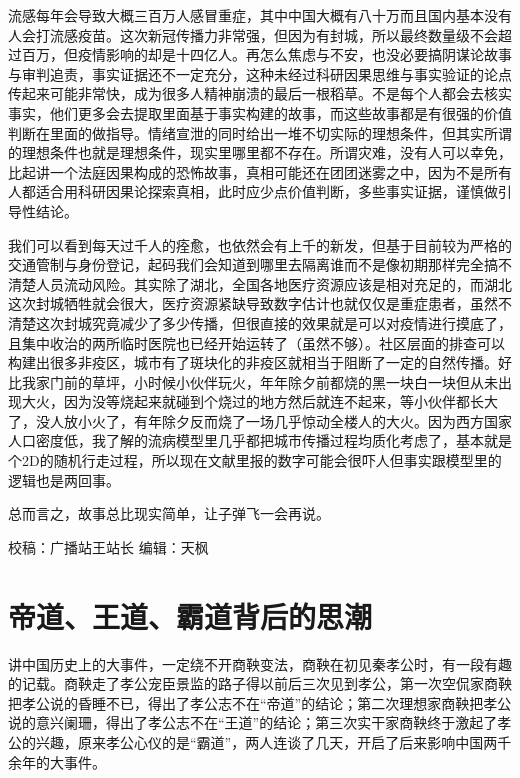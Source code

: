 \documentclass[]{book}
\begin{document}
流感每年会导致大概三百万人感冒重症，其中中国大概有八十万而且国内基本没有人会打流感疫苗。这次新冠传播力非常强，但因为有封城，所以最终数量级不会超过百万，但疫情影响的却是十四亿人。再怎么焦虑与不安，也没必要搞阴谋论故事与审判追责，事实证据还不一定充分，这种未经过科研因果思维与事实验证的论点传起来可能非常快，成为很多人精神崩溃的最后一根稻草。不是每个人都会去核实事实，他们更多会去提取里面基于事实构建的故事，而这些故事都是有很强的价值判断在里面的做指导。情绪宣泄的同时给出一堆不切实际的理想条件，但其实所谓的理想条件也就是理想条件，现实里哪里都不存在。所谓灾难，没有人可以幸免，比起讲一个法庭因果构成的恐怖故事，真相可能还在团团迷雾之中，因为不是所有人都适合用科研因果论探索真相，此时应少点价值判断，多些事实证据，谨慎做引导性结论。

我们可以看到每天过千人的痊愈，也依然会有上千的新发，但基于目前较为严格的交通管制与身份登记，起码我们会知道到哪里去隔离谁而不是像初期那样完全搞不清楚人员流动风险。其实除了湖北，全国各地医疗资源应该是相对充足的，而湖北这次封城牺牲就会很大，医疗资源紧缺导致数字估计也就仅仅是重症患者，虽然不清楚这次封城究竟减少了多少传播，但很直接的效果就是可以对疫情进行摸底了，且集中收治的两所临时医院也已经开始运转了（虽然不够）。社区层面的排查可以构建出很多非疫区，城市有了斑块化的非疫区就相当于阻断了一定的自然传播。好比我家门前的草坪，小时候小伙伴玩火，年年除夕前都烧的黑一块白一块但从未出现大火，因为没等烧起来就碰到个烧过的地方然后就连不起来，等小伙伴都长大了，没人放小火了，有年除夕反而烧了一场几乎惊动全楼人的大火。因为西方国家人口密度低，我了解的流病模型里几乎都把城市传播过程均质化考虑了，基本就是个2D的随机行走过程，所以现在文献里报的数字可能会很吓人但事实跟模型里的逻辑也是两回事。

总而言之，故事总比现实简单，让子弹飞一会再说。

校稿：广播站王站长
编辑：天枫

\hypertarget{ux5e1dux9053ux738bux9053ux9738ux9053ux80ccux540eux7684ux601dux6f6e}{%
\section{帝道、王道、霸道背后的思潮}\label{ux5e1dux9053ux738bux9053ux9738ux9053ux80ccux540eux7684ux601dux6f6e}}

讲中国历史上的大事件，一定绕不开商鞅变法，商鞅在初见秦孝公时，有一段有趣的记载。商鞅走了孝公宠臣景监的路子得以前后三次见到孝公，第一次空侃家商鞅把孝公说的昏睡不已，得出了孝公志不在``帝道''的结论；第二次理想家商鞅把孝公说的意兴阑珊，得出了孝公志不在``王道''的结论；第三次实干家商鞅终于激起了孝公的兴趣，原来孝公心仪的是``霸道''，两人连谈了几天，开启了后来影响中国两千余年的大事件。
\end{document}
